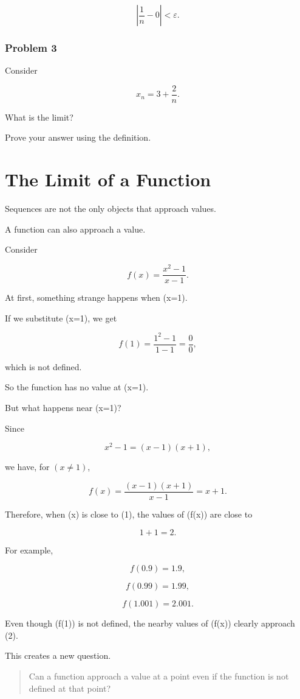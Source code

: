 \[
\left|\frac{1}{n}-0\right|<\varepsilon.
\]

\subsubsection*{Problem 3}

Consider

\[
x_n=3+\frac{2}{n}.
\]

What is the limit?

Prove your answer using the definition.

\section{The Limit of a Function}

Sequences are not the only objects that approach values.

A function can also approach a value.

Consider

\[
f(x)=\frac{x^2-1}{x-1}.
\]

At first, something strange happens when (x=1).

If we substitute (x=1), we get

\[
f(1)=\frac{1^2-1}{1-1}=\frac{0}{0},
\]

which is not defined.

So the function has no value at (x=1).

But what happens near (x=1)?

Since

\[
x^2-1=(x-1)(x+1),
\]

we have, for $(x\neq 1)$,

\[
f(x)=\frac{(x-1)(x+1)}{x-1}=x+1.
\]

Therefore, when (x) is close to (1), the values of (f(x)) are close to

\[
1+1=2.
\]

For example,

\[
f(0.9)=1.9,
\]

\[
f(0.99)=1.99,
\]

\[
f(1.001)=2.001.
\]

Even though (f(1)) is not defined, the nearby values of (f(x)) clearly approach (2).

This creates a new question.

\begin{quote}
Can a function approach a value at a point even if the function is not defined at that point?
\end{quote}

